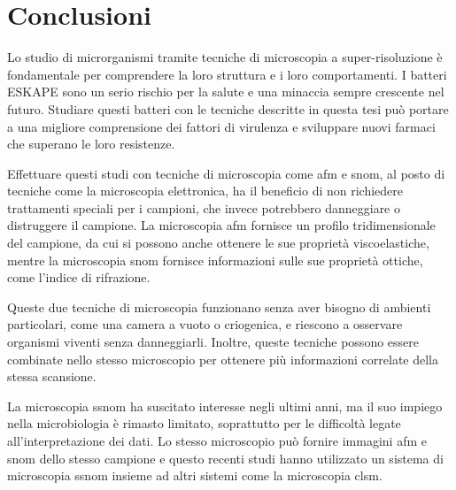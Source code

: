 \documentclass[../main.tex]{subfiles}
\begin{document}
\chapter{Conclusioni}

Lo studio di microrganismi tramite tecniche di microscopia a super-risoluzione è fondamentale per comprendere la loro struttura e i loro comportamenti. I batteri ESKAPE\cite{eskape} sono un serio rischio per la salute\cite{rice_2008} e una minaccia sempre crescente nel futuro.\cite{pipito_2025} Studiare questi batteri con le tecniche descritte in questa tesi può portare a una migliore comprensione dei fattori di virulenza e sviluppare nuovi farmaci che superano le loro resistenze.

Effettuare questi studi con tecniche di microscopia come \acrshort{afm} e \acrshort{snom}, al posto di tecniche come la microscopia elettronica, ha il beneficio di non richiedere trattamenti speciali per i campioni, che invece potrebbero danneggiare o distruggere il campione. La microscopia \acrshort{afm} fornisce un profilo tridimensionale del campione, da cui si possono anche ottenere le sue proprietà viscoelastiche, mentre la microscopia \acrshort{snom} fornisce informazioni sulle sue proprietà ottiche, come l'indice di rifrazione.

Queste due tecniche di microscopia funzionano senza aver bisogno di ambienti particolari, come una camera a vuoto o criogenica, e riescono a osservare organismi viventi senza danneggiarli. Inoltre, queste tecniche possono essere combinate nello stesso microscopio per ottenere più informazioni correlate della stessa scansione.

La microscopia \acrshort{ssnom} ha suscitato interesse negli ultimi anni, ma il suo impiego nella \gls{microbiologia} è rimasto limitato, soprattutto per le difficoltà legate all'interpretazione dei dati. Lo stesso microscopio può fornire immagini \acrshort{afm} e \acrshort{snom} dello stesso campione e questo recenti studi hanno utilizzato un sistema di microscopia \acrshort{ssnom} insieme ad altri sistemi come la microscopia \acrshort{clsm}.\cite{stanciu_2017}
\end{document}
